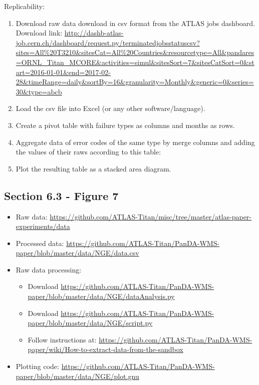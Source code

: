 Replicability:

\begin{enumerate}
    \item Download raw data download in csv format from the ATLAS jobs dashboard. Download link: \url{http://dashb-atlas-job.cern.ch/dashboard/request.py/terminatedjobsstatuscsv?sites=All%20T3210&sitesCat=All%20Countries&resourcetype=All&pandares=ORNL_Titan_MCORE&activities=simul&sitesSort=7&sitesCatSort=0&start=2016-01-01&end=2017-02-28&timeRange=daily&sortBy=16&granularity=Monthly&generic=0&series=30&type=abcb}
    \item Load the csv file into Excel (or any other software/language).
    \item Create a pivot table with failure types as columns and months as rows.
    \item Aggregate data of error codes of the same type by merge columns and adding the values of their raws according to this table:
    \item Plot the resulting table as a stacked area diagram.
\end{enumerate}


\subsection{Section 6.3 - Figure 7}
\label{apndx:fig9}

\begin{itemize}
    \item Raw data: \url{https://github.com/ATLAS-Titan/misc/tree/master/atlas-paper-experiments/data}
     \item Processed data: \url{ https://github.com/ATLAS-Titan/PanDA-WMS-paper/blob/master/data/NGE/data.csv} 
    \item Raw data processing: 
    	\begin{itemize}
    		\item Download \url{https://github.com/ATLAS-Titan/PanDA-WMS-paper/blob/master/data/NGE/dataAnalysis.py}
    		\item Download \url{https://github.com/ATLAS-Titan/PanDA-WMS-paper/blob/master/data/NGE/script.py}
    		\item Follow instructions at: \url{https://github.com/ATLAS-Titan/PanDA-WMS-paper/wiki/How-to-extract-data-from-the-sandbox}
   	\end{itemize}
    \item Plotting code: \url{https://github.com/ATLAS-Titan/PanDA-WMS-paper/blob/master/data/NGE/plot.gnu}
\end{itemize}


